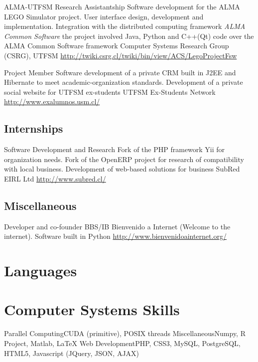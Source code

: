\documentclass[11pt,a4paper]{moderncv}
\begin{document}
        {ALMA-UTFSM Research Assistantship}
        {Software development for the ALMA LEGO Simulator project. User interface design, development and implementation. Integration with the distributed computing framework \emph{ALMA Common Software}}
        {the project involved Java, Python and C++(Qt) code over the ALMA Common Software framework}
        {Computer Systems Research Group (CSRG), UTFSM}
        {\url{http://twiki.csrg.cl/twiki/bin/view/ACS/LegoProjectFsw}}
        
        {Project Member}
        {Software development of a private CRM built in J2EE and Hibernate to meet academic-organization standards. Development of a private social website for UTFSM ex-students}
        {UTFSM Ex-Students Network}
        {}
        {\url{http://www.exalumnos.usm.cl/}}
        
        
\subsection{Internships}


        {Software Development and Research}
        {Fork of the PHP framework Yii for organization needs. Fork of the OpenERP project for research of compatibility with local business. Development of web-based solutions for business}
        {SubRed EIRL Ltd}
        {}
        {\url{http://www.subred.cl/}}
        
        
\subsection{Miscellaneous}


        {Developer and co-founder}
        {BBS/IB Bienvenido a Internet (Welcome to the internet). Software built in Python}
        {}
        {}
        {\url{http://www.bienvenidoainternet.org/}}
        
\section{Languages}

\section{Computer Systems Skills}
           {Parallel Computing}{CUDA (primitive), POSIX threads}
           {Miscellaneous}{Numpy, R Project, Matlab, \LaTeX}
           {Web Development}{PHP, CSS3, MySQL, PostgreSQL, HTML5, Javascript (JQuery, JSON, AJAX)}
\end{document}
